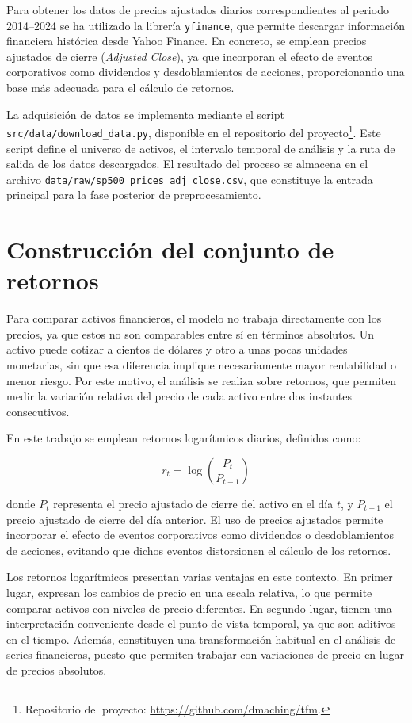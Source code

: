 Para obtener los datos de precios ajustados diarios correspondientes al periodo 2014--2024 se ha utilizado la librería \texttt{yfinance}, que permite descargar información financiera histórica desde Yahoo Finance. En concreto, se emplean precios ajustados de cierre (\textit{Adjusted Close}), ya que incorporan el efecto de eventos corporativos como dividendos y desdoblamientos de acciones, proporcionando una base más adecuada para el cálculo de retornos.

La adquisición de datos se implementa mediante el script \texttt{src/data/download\_data.py}, disponible en el repositorio del proyecto\footnote{Repositorio del proyecto: \url{https://github.com/dmaching/tfm}.}. Este script define el universo de activos, el intervalo temporal de análisis y la ruta de salida de los datos descargados. El resultado del proceso se almacena en el archivo \texttt{data/raw/sp500\_prices\_adj\_close.csv}, que constituye la entrada principal para la fase posterior de preprocesamiento.

\section{Construcción del conjunto de retornos}

Para comparar activos financieros, el modelo no trabaja directamente con los precios, ya que estos no son comparables entre sí en términos absolutos. Un activo puede cotizar a cientos de dólares y otro a unas pocas unidades monetarias, sin que esa diferencia implique necesariamente mayor rentabilidad o menor riesgo. Por este motivo, el análisis se realiza sobre retornos, que permiten medir la variación relativa del precio de cada activo entre dos instantes consecutivos.

En este trabajo se emplean retornos logarítmicos diarios, definidos como:

\begin{equation}
r_t = \log\left(\frac{P_t}{P_{t-1}}\right)
\label{eq:retorno_logaritmico}
\end{equation}

donde \(P_t\) representa el precio ajustado de cierre del activo en el día \(t\), y \(P_{t-1}\) el precio ajustado de cierre del día anterior. El uso de precios ajustados permite incorporar el efecto de eventos corporativos como dividendos o desdoblamientos de acciones, evitando que dichos eventos distorsionen el cálculo de los retornos.

Los retornos logarítmicos presentan varias ventajas en este contexto. En primer lugar, expresan los cambios de precio en una escala relativa, lo que permite comparar activos con niveles de precio diferentes. En segundo lugar, tienen una interpretación conveniente desde el punto de vista temporal, ya que son aditivos en el tiempo. Además, constituyen una transformación habitual en el análisis de series financieras, puesto que permiten trabajar con variaciones de precio en lugar de precios absolutos.


